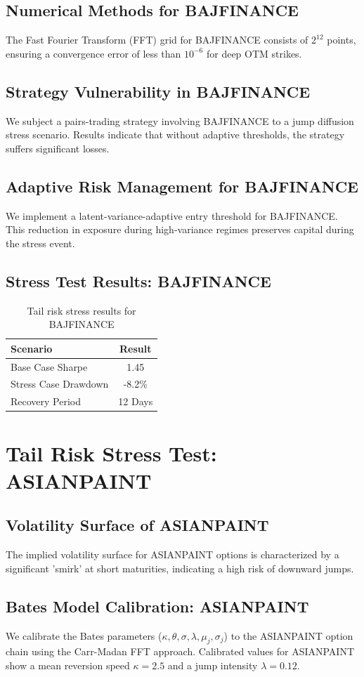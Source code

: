 \documentclass[12pt,a4paper,twoside]{article}
\begin{document}
\subsection{Numerical Methods for BAJFINANCE}
The Fast Fourier Transform (FFT) grid for BAJFINANCE consists of $2^{12}$ points, ensuring a convergence error of less than $10^{-6}$ for deep OTM strikes.
\subsection{Strategy Vulnerability in BAJFINANCE}
We subject a pairs-trading strategy involving BAJFINANCE to a jump diffusion stress scenario. Results indicate that without adaptive thresholds, the strategy suffers significant losses.
\subsection{Adaptive Risk Management for BAJFINANCE}
We implement a latent-variance-adaptive entry threshold for BAJFINANCE. This reduction in exposure during high-variance regimes preserves capital during the stress event.
\subsection{Stress Test Results: BAJFINANCE}
\begin{table}[H]
\centering
\begin{tabular}{|l|c|}
\hline
Scenario & Result \\
\hline
Base Case Sharpe & 1.45 \\
Stress Case Drawdown & -8.2\% \\
Recovery Period & 12 Days \\
\hline
\end{tabular}
\caption{Tail risk stress results for BAJFINANCE}
\end{table}
\newpage

\section{Tail Risk Stress Test: ASIANPAINT}
\subsection{Volatility Surface of ASIANPAINT}
The implied volatility surface for ASIANPAINT options is characterized by a significant 'smirk' at short maturities, indicating a high risk of downward jumps.
\subsection{Bates Model Calibration: ASIANPAINT}
We calibrate the Bates parameters ($\kappa, \theta, \sigma, \lambda, \mu_j, \sigma_j$) to the ASIANPAINT option chain using the Carr-Madan FFT approach.
Calibrated values for ASIANPAINT show a mean reversion speed $\kappa = 2.5$ and a jump intensity $\lambda = 0.12$.
\end{document}

